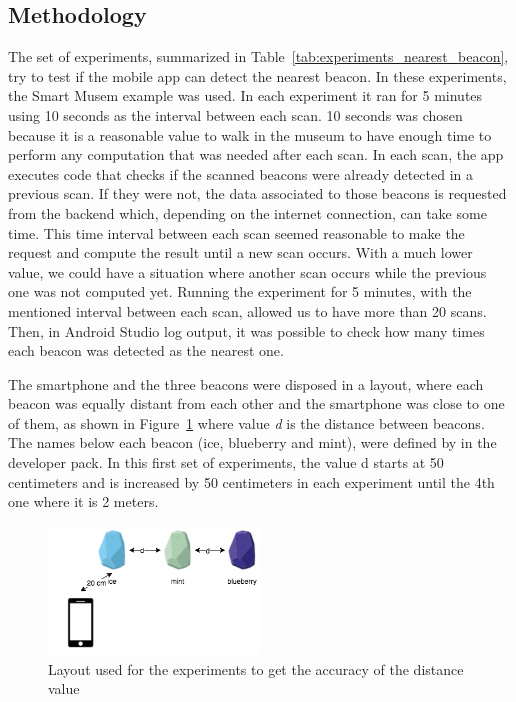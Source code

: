 \subsection{Methodology}
\label{sub:evaluation_nearest_beacon_methodology}
The set of experiments, summarized in Table~\ref{tab:experiments_nearest_beacon}, try to test if the mobile app can detect the nearest beacon.
In these experiments, the Smart Musem example was used.
In each experiment it ran for 5 minutes using 10 seconds as the interval between each scan.
10 seconds was chosen because it is a reasonable value to walk in the museum to have enough time to perform any computation that was needed after each scan.
In each scan, the app executes code that checks if the scanned beacons were already detected in a previous scan. If they were not, the data associated to those beacons is requested from the backend which, depending on the internet connection, can take some time.
This time interval between each scan seemed reasonable to make the request and compute the result until a new scan occurs.
With a much lower value, we could have a situation where another scan occurs while the previous one was not computed yet.
Running the experiment for 5 minutes, with the mentioned interval between each scan, allowed us to have more than 20 scans.
Then, in Android Studio log output, it was possible to check how many times each beacon was detected as the nearest one.

The smartphone and the three beacons were disposed in a layout, where each beacon was equally distant from each other and the smartphone was close to one of them, as shown in Figure~\ref{fig:layout_experiments_nearest_beacon} where value \emph{d} is the distance between beacons.
The names below each beacon (ice, blueberry and mint), were defined by  in
the developer pack.
In this first set of experiments, the value d starts at 50 centimeters and is increased by 50 centimeters in each experiment until the 4th one where it is 2 meters.



\begin{figure}[!ht]
  \centering
    \includegraphics[width=0.5\textwidth, keepaspectratio]{images/nearest_beacon}
    \caption[Layout for experiments of nearest beacon]{Layout used for the experiments to get the accuracy of the distance value}
    \label{fig:layout_experiments_nearest_beacon}
\end{figure}


